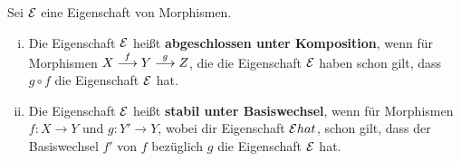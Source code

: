 \begin{defn}
\label{defn:8.10}
	Sei $\mathcal{E}$ eine Eigenschaft von Morphismen.
	\begin{enumerate}[i)]
		\item Die Eigenschaft $\mathcal{E}$ heißt \textbf{abgeschlossen unter Komposition}, wenn für Morphismen $X \overset{f}{\longrightarrow} Y \overset{g}{\longrightarrow}Z$, die die Eigenschaft $\mathcal{E}$ haben schon gilt, dass $g \circ f$ die Eigenschaft $\mathcal{E}$ hat.
		\item Die Eigenschaft $\mathcal{E}$ heißt \textbf{stabil unter Basiswechsel}, wenn für Morphismen $f\colon X \to Y$ und $g \colon Y' \to Y$, wobei dir Eigenschaft $\mathcal{E} hat$, schon gilt, dass der Basiswechsel $f'$ von $f$ bezüglich $g$ die Eigenschaft $\mathcal{E}$ hat.
	\end{enumerate}
\end{defn}

